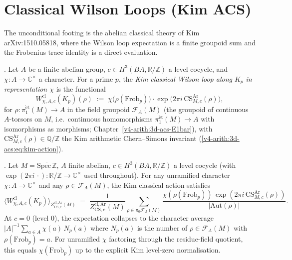 \section{Classical Wilson Loops (Kim ACS)}
\label{v4-arith:w9-r1:classical}

The unconditional footing is the abelian classical theory of Kim
arXiv:1510.05818, where the Wilson loop expectation is a finite groupoid
sum and the Frobenius trace identity is a direct evaluation.

\begin{definition}
\label{v4-arith:w9-r1:def:classical-wilson}
\ClaimStatusDefinitional. Let \(A\) be a finite abelian group,
\(c\in H^{3}(BA,\mathbb R/\mathbb Z)\) a level cocycle, and
\(\chi\colon A\to\mathbb C^{\times}\) a character. For a prime \(p\), the
\emph{Kim classical Wilson loop along \(K_{p}\) in representation
\(\chi\)} is the functional
\begin{equation}
\label{v4-arith:w9-r1:eq:classical-wilson}
W^{\mathrm{cl}}_{\chi,A,c}(K_{p})(\rho)\;:=\;
\chi\bigl(\rho(\mathrm{Frob}_{p})\bigr)\cdot
\exp\!\bigl(2\pi i\,\mathrm{CS}^{\mathrm{Ar}}_{M,c}(\rho)\bigr),
\end{equation}
for \(\rho\colon\pi_{1}^{\mathrm{\acute et}}(M)\to A\) in the field
groupoid \(\mathcal F_{A}(M)\) (the groupoid of continuous \(A\)-torsors
on \(M\), i.e.\ continuous homomorphisms
\(\pi_{1}^{\mathrm{\acute et}}(M)\to A\) with isomorphisms as morphisms;
Chapter~\ref{v4-arith:3d-acs-E1bar}), with
\(\mathrm{CS}^{\mathrm{Ar}}_{M,c}(\rho)\in\mathbb Q/\mathbb Z\) the Kim
arithmetic Chern--Simons invariant (\eqref{v4-arith:3d-acs:eq:kim-action}).
\end{definition}

\begin{theorem}[classical Wilson expectation = character of Frobenius]
\label{v4-arith:w9-r1:thm:classical-wilson-frob}
\ClaimStatusProvedHere. Let \(M=\overline{\mathrm{Spec}\,\mathbb Z}\),
\(A\) finite abelian, \(c\in H^{3}(BA,\mathbb R/\mathbb Z)\) a level cocycle
(with \(\exp(2\pi i\,\cdot)\colon\mathbb R/\mathbb Z\to\mathbb C^{\times}\)
used throughout). For
any unramified character \(\chi\colon A\to\mathbb C^{\times}\) and any
\(\rho\in\mathcal F_{A}(M)\), the Kim classical action satisfies
\begin{equation}
\label{v4-arith:w9-r1:eq:classical-wilson-frob}
\langle W^{\mathrm{cl}}_{\chi,A,c}(K_{p})\rangle_{Z^{\mathrm{cl,Ar}}_{\mathrm{CS},c}(M)}
\;=\;
\frac{1}{Z^{\mathrm{cl,Ar}}_{\mathrm{CS},c}(M)}
\sum_{\rho\in\pi_{0}\mathcal F_{A}(M)}
\frac{\chi(\rho(\mathrm{Frob}_{p}))\,
\exp(2\pi i\,\mathrm{CS}^{\mathrm{Ar}}_{M,c}(\rho))}
{|\mathrm{Aut}(\rho)|}.
\end{equation}
At \(c=0\) (level \(0\)), the expectation collapses to the character
average
\(|A|^{-1}\sum_{a\in A}\chi(a)\,N_{p}(a)\)
where \(N_{p}(a)\) is the number of \(\rho\in\mathcal F_{A}(M)\) with
\(\rho(\mathrm{Frob}_{p})=a\). For unramified \(\chi\) factoring through
the residue-field quotient, this equals
\(\chi(\mathrm{Frob}_{p})\) up to the explicit Kim level-zero
normalisation.
\end{theorem}

